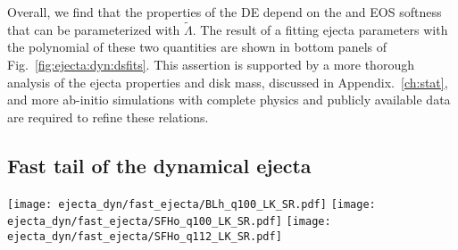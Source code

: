 Overall, we find that the properties of the \ac{DE} depend on the \mr{} and 
\ac{EOS} softness that can be parameterized with $\tilde{\Lambda}$. 
The result of a fitting ejecta parameters with the polynomial of these two quantities 
are shown in bottom panels of Fig.~\ref{fig:ejecta:dyn:dsfits}.
%
This assertion is supported by a more thorough analysis of the ejecta 
properties and disk mass, discussed in Appendix.~\ref{ch:stat}, 
%
and more ab-initio simulations with complete physics and publicly available 
data are required to refine these relations.




\subsection{Fast tail of the dynamical ejecta} \label{sec:bns_sims:fast_de}

\begin{figure*}
    \centering 
    \texttt{[image: ejecta\_dyn/fast\_ejecta/BLh\_q100\_LK\_SR.pdf]}
    \texttt{[image: ejecta\_dyn/fast\_ejecta/SFHo\_q100\_LK\_SR.pdf]}
    \texttt{[image: ejecta\_dyn/fast\_ejecta/SFHo\_q112\_LK\_SR.pdf]}
    \caption{
        Ejection mechanism and properties of the fast tail of the ejecta shown for three simulations,
        with two \acp{EOS}: BLh and SFHo and two \mr{}s: $q=1.00$ and $q=1.22$.
        The upper panel in each plot shows the time evolution of the maximum density 
        in the simulation (green curves) and the mass flux of the ejecta with 
        asymptotic velocities exceeding $0.6c$ (red curve).
        The bottom panel shows the mass histogram of the fast ejecta tail as a function 
        of time. 
        In both panels the outflow rate and histograms are computed at a radius of 
        $R = 443$~km and shifted in time by 
        $R\langle\upsilon_{\rm fast}\rangle ^{-1}$, 
        $\langle\upsilon_{\rm fast}\rangle$ being the mass averaged velocity of 
        the fast tail at the radius $R$.
        The plot shows that most of the fast ejecta are generally produced at first core \bnc{} with a contribution from the second in models with soft \acp{EOS}.
        (Adapted from \citet{Nedora:2021eoj})
    } 
    \label{fig:ejecta_v06_mech}
\end{figure*}


